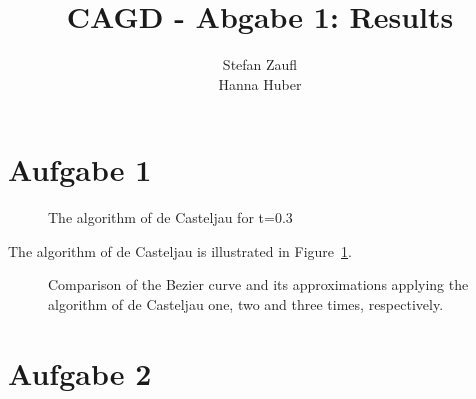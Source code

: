 \documentclass[12pt]{article}
\title{CAGD - Abgabe 1: Results}
\author{Stefan Zaufl \\ Hanna Huber}
\begin{document}
\maketitle

\section{Aufgabe 1}

\begin{figure}
\caption{The algorithm of de Casteljau for t=0.3}
\label{fig:1a}
\end{figure}

The algorithm of de Casteljau is illustrated in Figure~\ref{fig:1a}.

\begin{figure}
\caption{Comparison of the Bezier curve and its approximations applying the algorithm of de Casteljau one, two and three times, respectively.}
\label{fig:1b}
\end{figure}


\section{Aufgabe 2}
\end{document}
